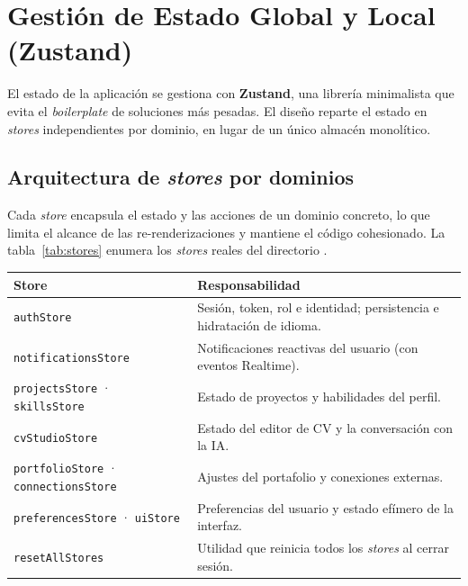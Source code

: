 \section{Gestión de Estado Global y Local (Zustand)}
\label{sec:zustand}

El estado de la aplicación se gestiona con \textbf{Zustand}, una librería minimalista que
evita el \textit{boilerplate} de soluciones más pesadas. El diseño reparte el estado en
\textit{stores} independientes por dominio, en lugar de un único almacén monolítico.

\subsection{Arquitectura de \textit{stores} por dominios}
\label{subsec:stores}

Cada \textit{store} encapsula el estado y las acciones de un dominio concreto, lo que
limita el alcance de las re-renderizaciones y mantiene el código cohesionado. La
tabla~\ref{tab:stores} enumera los \textit{stores} reales del directorio .

\vspace{0.2cm}
\noindent
\renewcommand{\arraystretch}{1.3}
\fontsize{8.5}{10.2}\selectfont\sffamily
\begin{tabularx}{\textwidth}{|L{4.0cm}|Y|}
\hline
{}
\sffamily\textbf{Store} & \sffamily\textbf{Responsabilidad} \\
\hline
\texttt{authStore} & Sesión, token, rol e identidad; persistencia e hidratación de idioma. \\
\hline
{}
\texttt{notificationsStore} & Notificaciones reactivas del usuario (con eventos Realtime). \\
\hline
\texttt{projectsStore} · \texttt{skillsStore} & Estado de proyectos y habilidades del perfil. \\
\hline
{}
\texttt{cvStudioStore} & Estado del editor de CV y la conversación con la IA. \\
\hline
\texttt{portfolioStore} · \texttt{connectionsStore} & Ajustes del portafolio y conexiones externas. \\
\hline
{}
\texttt{preferencesStore} · \texttt{uiStore} & Preferencias del usuario y estado efímero de la interfaz. \\
\hline
\texttt{resetAllStores} & Utilidad que reinicia todos los \textit{stores} al cerrar sesión. \\
\hline
\end{tabularx}
\label{tab:stores}

